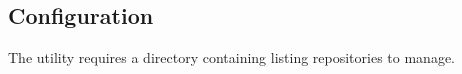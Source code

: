 
\subsection{Configuration}
The  utility requires a  directory containing
 listing repositories to manage.




